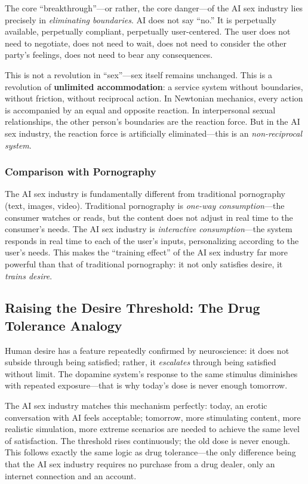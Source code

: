 ﻿\documentclass[12pt,a4paper]{article}
\begin{document}
The core ``breakthrough''---or rather, the core danger---of the AI sex industry lies precisely in \textit{eliminating boundaries}. AI does not say ``no.'' It is perpetually available, perpetually compliant, perpetually user-centered. The user does not need to negotiate, does not need to wait, does not need to consider the other party's feelings, does not need to bear any consequences.

This is not a revolution in ``sex''---sex itself remains unchanged. This is a revolution of \textbf{unlimited accommodation}: a service system without boundaries, without friction, without reciprocal action. In Newtonian mechanics, every action is accompanied by an equal and opposite reaction. In interpersonal sexual relationships, the other person's boundaries are the reaction force. But in the AI sex industry, the reaction force is artificially eliminated---this is an \emph{non-reciprocal system}.

\subsubsection{Comparison with Pornography}

The AI sex industry is fundamentally different from traditional pornography (text, images, video). Traditional pornography is \emph{one-way consumption}---the consumer watches or reads, but the content does not adjust in real time to the consumer's needs. The AI sex industry is \emph{interactive consumption}---the system responds in real time to each of the user's inputs, personalizing according to the user's needs. This makes the ``training effect'' of the AI sex industry far more powerful than that of traditional pornography: it not only satisfies desire, it \emph{trains desire}.

\subsection{Raising the Desire Threshold: The Drug Tolerance Analogy}

Human desire has a feature repeatedly confirmed by neuroscience: it does not subside through being satisfied; rather, it \emph{escalates} through being satisfied without limit. The dopamine system's response to the same stimulus diminishes with repeated exposure---that is why today's dose is never enough tomorrow.

The AI sex industry matches this mechanism perfectly: today, an erotic conversation with AI feels acceptable; tomorrow, more stimulating content, more realistic simulation, more extreme scenarios are needed to achieve the same level of satisfaction. The threshold rises continuously; the old dose is never enough. This follows exactly the same logic as drug tolerance---the only difference being that the AI sex industry requires no purchase from a drug dealer, only an internet connection and an account.
\end{document}
